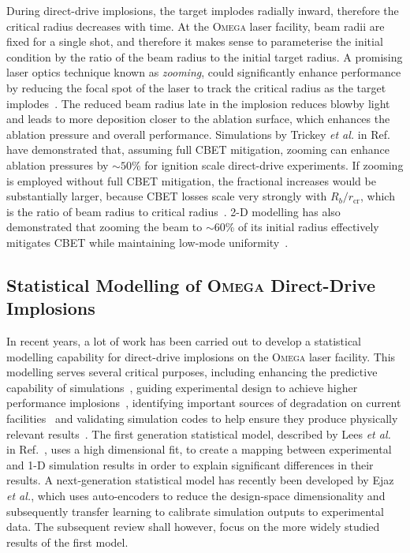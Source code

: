 During direct-drive implosions, the target implodes radially inward, therefore the critical radius decreases with time.
At the \textsc{Omega} laser facility, beam radii are fixed for a single shot, and therefore it makes sense to parameterise the initial condition by the ratio of the beam radius to the initial target radius.
A promising laser optics technique known as \textit{zooming}, could significantly enhance performance by reducing the focal spot of the laser to track the critical radius as the target implodes~\cite{kehne_implementation_2013}.
The reduced beam radius late in the implosion reduces blowby light and leads to more deposition closer to the ablation surface, which enhances the ablation pressure and overall performance.
Simulations by Trickey \textit{et al.} in Ref.~\cite{trickey_physics_2024} have demonstrated that, assuming full \ac{CBET} mitigation, zooming can enhance ablation pressures by $\sim50\%$ for ignition scale direct-drive experiments.
If zooming is employed without full \ac{CBET} mitigation, the fractional increases would be substantially larger, because \ac{CBET} losses scale very strongly with $R_b/r_{\text{cr}}$, which is the ratio of beam radius to critical radius~\cite{colaitis_exploration_2023}.
2-D modelling has also demonstrated that zooming the beam to $\sim60$\% of its initial radius effectively mitigates \ac{CBET} while maintaining low-mode uniformity~\cite{igumenshchev_laserbeam_2013}.

\subsection{Statistical Modelling of \textsc{Omega} Direct-Drive Implosions}%
\label{sec:Res1_OMEGA_stat_modelling}

In recent years, a lot of work has been carried out to develop a statistical modelling capability for direct-drive implosions on the \textsc{Omega} laser facility.
This modelling serves several critical purposes, including enhancing the predictive capability of simulations~\cite{lees_experimentally_2021}, guiding experimental design to achieve higher performance implosions~\cite{gopalaswamy_tripled_2019}, identifying important sources of degradation on current facilities~\cite{lees_understanding_2023,gopalaswamy_using_2021} and validating simulation codes to help ensure they produce physically relevant results~\cite{ejaz_deep_2024}.
The first generation statistical model, described by Lees \textit{et al.} in Ref.~\cite{lees_experimentally_2021}, uses a high dimensional fit, to create a mapping between experimental and 1-D simulation results in order to explain significant differences in their results.
A next-generation statistical model has recently been developed by Ejaz \textit{et al.}, which uses auto-encoders to reduce the design-space dimensionality and subsequently transfer learning to calibrate simulation outputs to experimental data.
The subsequent review shall however, focus on the more widely studied results of the first model.

